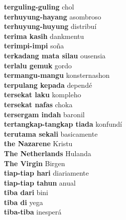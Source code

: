 \textbf{ terguling-guling  } chol \\
\textbf{ terhuyung-hayang  } asombroso \\
\textbf{ terhuyung-huyung  } distribuí \\
\textbf{ terima kasih  } dankmentu \\
\textbf{ terimpi-impi  } soña \\
\textbf{ terkadang mata silau  } ousensia \\
\textbf{ terlalu gemuk  } gordo \\
\textbf{ termangu-mangu  } konsternashon \\
\textbf{ terpulang kepada  } dependé \\
\textbf{ tersekat laku  } kompleho \\
\textbf{ tersekat nafas  } choka \\
\textbf{ tersergam indah  } baronil \\
\textbf{ tertangkap-tangkap tiada  } konfundí \\
\textbf{ terutama sekali  } basicamente \\
\textbf{ the Nazarene  } Kristu \\
\textbf{ The Netherlands  } Hulanda \\
\textbf{ The Virgin  } Birgen \\
\textbf{ tiap-tiap hari  } diariamente \\
\textbf{ tiap-tiap tahun  } anual \\
\textbf{ tiba dari  } bini \\
\textbf{ tiba di  } yega \\
\textbf{ tiba-tiba  } inesperá \\
